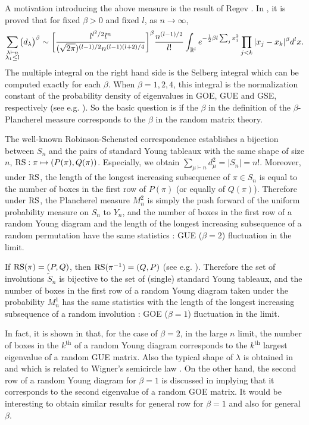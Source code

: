 A motivation introducing the above measure is the result of 
Regev \cite{Re}. 
In \cite{Re}, it is proved that for fixed $\beta >0$ and fixed $l$,
as $n\to\infty$,
\begin{equation}\label{int-as-1}
   \sum_{\substack{\lambda\vdash n \\ \lambda_1\le l}}
\bigl(d_\lambda\bigr)^\beta
\sim \biggl[ \frac{l^{l^2/2}l^n}{(\sqrt{2\pi})^{(l-1)/2}n^{(l-1)(l+2)/4}}
\biggr]^\beta \frac{n^{(l-1)/2}}{l!}
\int_{\mathbb R^l} e^{-\frac12\beta l\sum_{j}x_j^2}
\prod_{j<k} |x_j-x_k|^\beta d^l x.
\end{equation}
The multiple integral on the right hand side is 
the Selberg integral which can be computed exactly for each $\beta$.
When $\beta=1,2,4$, this integral is 
the normalization constant of the probability 
density of eigenvalues in 
GOE, GUE and GSE, respectively (see e.g. \cite{Mehta}).
So the basic question is if the $\beta$ in the definition 
of the $\beta$-Plancherel measure corresponds to 
the $\beta$ in the random matrix theory.

The well-known Robinson-Schensted correspondence \cite{Sc} 
establishes a bijection between 
$S_n$ and the pairs of standard Young tableaux with the same
shape of size $n$, $\operatorname{RS} : \pi \mapsto (P(\pi),Q(\pi))$.
Especially, we obtain $\sum_{\mu\vdash n} d_\mu^2= |S_n|=n!$.
Moreover, under $\operatorname{RS}$, the length of the longest increasing subsequence 
of $\pi\in S_n$ is equal to the number of boxes in the first 
row of $P(\pi)$ (or equally of $Q(\pi)$).
Therefore under $\operatorname{RS}$, the Plancherel measure $M^2_n$ is 
simply the push forward of 
the uniform probability measure on $S_n$ to $Y_n$, 
and the number of boxes in the first row of a random Young diagram 
and the length of the longest increasing subsequence of a random 
permutation have the same statistics : GUE ($\beta=2$) 
fluctuation in the limit.

If $\operatorname{RS}(\pi)=(P,Q)$, then $\operatorname{RS}(\pi^{-1})=(Q,P)$ (see e.g. \cite{Kn}).
Therefore the set of involutions $\tilde{S}_n$ is bijective to 
the set of (single) standard Young tableaux, and 
the number of boxes in the first row of a random Young diagram 
taken under the probability $M^1_n$ has the same statistics 
with the length of the longest increasing subsequence of a random
involution : GOE ($\beta=1$) fluctuation in the limit.

In fact, it is shown in \cite{Ok, BOO, kurtj:recent} that, 
for the case of $\beta=2$, in the large $n$ limit, 
the number of boxes in the $k^{\text{th}}$ of a random Young diagram 
corresponds to the $k^{\text{th}}$ largest eigenvalue 
of a random GUE matrix.
Also the typical shape of $\lambda$ is obtained in \cite{LS} and 
\cite{VK1} which is related to Wigner's semicircle law \cite{Kerov}.
On the other hand, the second row of a random Young diagram 
for $\beta=1$ is 
discussed in \cite{BR2} implying that it corresponds to 
the second eigenvalue of a random GOE matrix.
It would be interesting to obtain similar results for general row 
for $\beta=1$ and also for general $\beta$.

